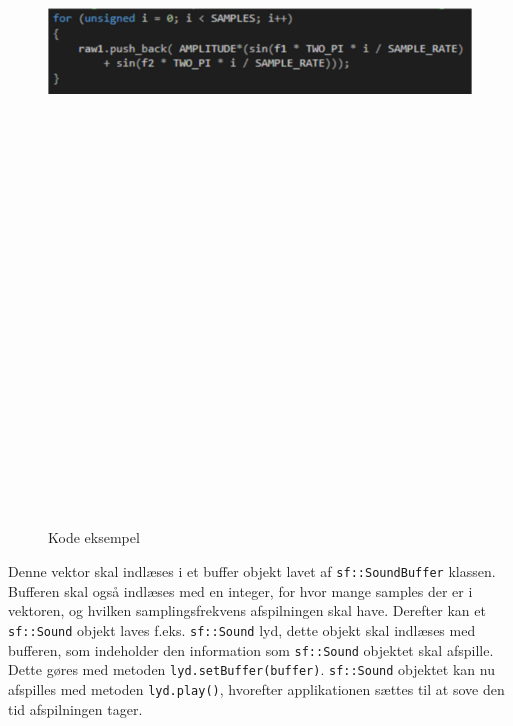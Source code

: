 \begin{figure}[ht]
	\centering
	\includegraphics[width=15cm,height=25cm,keepaspectratio]{pictures/DTMFkode.png}
	\caption{Kode eksempel}
	\label{fig:dtmfkode}
\end{figure}
\newline
Denne vektor skal indlæses i et buffer objekt lavet af \texttt{sf::\textcolor{dkgreen}{SoundBuffer}} klassen. Bufferen skal også indlæses med en integer, for hvor mange samples der er i vektoren, og hvilken samplingsfrekvens afspilningen skal have. Derefter kan et \texttt{sf::\textcolor{dkgreen}{Sound}} objekt laves f.eks. \texttt{sf::\textcolor{dkgreen}{Sound}} lyd, dette objekt skal indlæses med bufferen, som indeholder den information som \texttt{sf::\textcolor{dkgreen}{Sound}} objektet skal afspille. Dette gøres med metoden \texttt{lyd.setBuffer(buffer)}. \texttt{sf::\textcolor{dkgreen}{Sound}} objektet kan nu afspilles med metoden \texttt{lyd.play()}, hvorefter applikationen sættes til at sove den tid afspilningen tager.
\hfill \break

